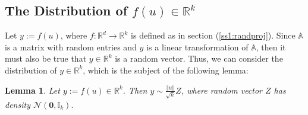 \documentclass{article}
\newtheorem{lemma}{Lemma}
\begin{document}
    \subsection{The Distribution of $f(u) \in \mathbb{R}^k$}

    Let $y := f(u)$, where $f: \mathbb{R}^d \rightarrow \mathbb{R}^k$ is defined as in section (\ref{ss1:randproj}). Since $\mathbb{A}$ is a matrix with random entries and $y$ is a linear transformation of $\mathbb{A}$, then it must also be true that $y \in \mathbb{R}^k$ is a random vector. Thus, we can consider the distribution of $y \in \mathbb{R}^k$, which is the subject of the following lemma:
    
    \begin{lemma}\label{lm:1}
    Let $y := f(u) \in \mathbb{R}^k$. Then $y \sim \frac{\left \Vert u \right \Vert}{\sqrt{k}} Z$, where random vector $Z$ has density $\mathcal{N}(\boldsymbol{0}, \mathbb{I}_k).$
    \end{lemma}
\end{document}
